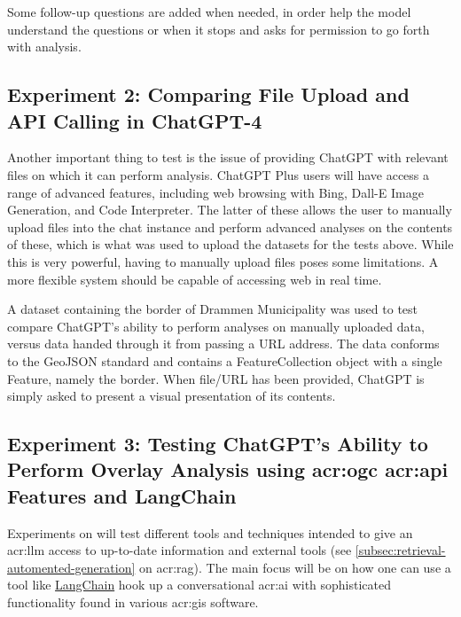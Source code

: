 Some follow-up questions are added when needed, in order help the model understand the questions or when it stops and asks for permission to go forth with analysis.

\subsection{Experiment 2: Comparing File Upload and API Calling in ChatGPT-4}

Another important thing to test is the issue of providing ChatGPT with relevant files on which it can perform analysis. ChatGPT Plus users will have access a range of advanced features, including web browsing with Bing, Dall-E Image Generation, and Code Interpreter. The latter of these allows the user to manually upload files into the chat instance and perform advanced analyses on the contents of these, which is what was used to upload the datasets for the tests above. While this is very powerful, having to manually upload files poses some limitations. A more flexible system should be capable of accessing web  in real time.

A dataset containing the border of Drammen Municipality was used to test compare ChatGPT's ability to perform analyses on manually uploaded data, versus data handed through it from passing a URL address. The data conforms to the GeoJSON standard and contains a FeatureCollection object with a single Feature, namely the border. When file/URL has been provided, ChatGPT is simply asked to present a visual presentation of its contents.

\subsection[Experiment 3: Testing ChatGPT's Ability to Perform Overlay Analysis using OGC API Features]{Experiment 3: Testing ChatGPT's Ability to Perform Overlay Analysis using \acrshort{acr:ogc} \acrshort{acr:api} Features and LangChain}

Experiments on  will test different tools and techniques intended to give an \acrshort{acr:llm} access to up-to-date information and external tools (see \autoref{subsec:retrieval-automented-generation} on \acrlong{acr:rag}). The main focus will be on how one can use a tool like \hyperref[subsubsec:langchain]{LangChain} hook up a conversational \acrshort{acr:ai} with sophisticated functionality found in various \acrshort{acr:gis} software.

